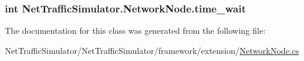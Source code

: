 \hypertarget{classNetTrafficSimulator_1_1NetworkNode_ad05b46a64426469cee1bc3a0f494e4cb}{
\subsubsection[{time\-\_\-wait}]{\setlength{\rightskip}{0pt plus 5cm}int Net\-Traffic\-Simulator.\-Network\-Node.\-time\-\_\-wait\hspace{0.3cm}{\ttfamily [private]}}}\label{classNetTrafficSimulator_1_1NetworkNode_ad05b46a64426469cee1bc3a0f494e4cb}


The documentation for this class was generated from the following file\-:\begin{DoxyCompactItemize}
\item 
Net\-Traffic\-Simulator/\-Net\-Traffic\-Simulator/framework/extension/\hyperlink{NetworkNode_8cs}{Network\-Node.\-cs}\end{DoxyCompactItemize}
